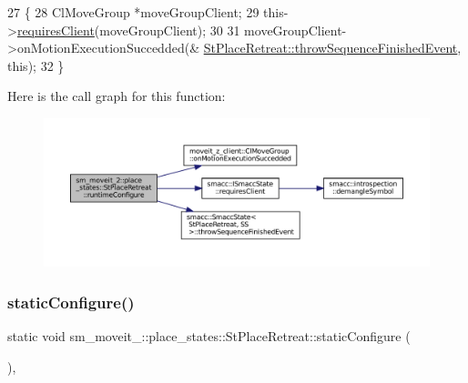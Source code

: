 \begin{DoxyCode}
27     \{
28         ClMoveGroup *moveGroupClient;
29         this->\hyperlink{classsmacc_1_1ISmaccState_a7f95c9f0a6ea2d6f18d1aec0519de4ac}{requiresClient}(moveGroupClient);
30 
31         moveGroupClient->onMotionExecutionSuccedded(&
      \hyperlink{classsmacc_1_1SmaccState_a49dcfc25824f7e083dd4b999c49ab2b6}{StPlaceRetreat::throwSequenceFinishedEvent}, \textcolor{keyword}{this});
32     \}
\end{DoxyCode}
Here is the call graph for this function\+:
\nopagebreak
\begin{figure}[H]
\begin{center}
\leavevmode
\includegraphics[width=350pt]{structsm__moveit__2_1_1place__states_1_1StPlaceRetreat_ab3c8e46bce1643ab6ecd415ecf1af6f6_cgraph}
\end{center}
\end{figure}
\mbox{\label{structsm__moveit__2_1_1place__states_1_1StPlaceRetreat_a572cebbcdbb30380ad4a72f22946922e}} 
\subsubsection{\texorpdfstring{static\+Configure()}{staticConfigure()}}
{\footnotesize\ttfamily static void sm\+\_\+moveit\+\_\+::place\+\_\+states\+::\+St\+Place\+Retreat\+::static\+Configure (\begin{DoxyParamCaption}{ }\end{DoxyParamCaption})\hspace{0.3cm}{\ttfamily [inline]}, {\ttfamily [static]}}



